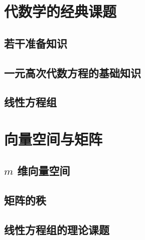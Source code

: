 \documentclass[a4paper, 11pt]{ctexbook}
\begin{document}
    \chapter{代数学的经典课题}
        \section{若干准备知识}
        \section{一元高次代数方程的基础知识}
        \section{线性方程组}
    \chapter{向量空间与矩阵}
        \section{$m$ 维向量空间}
            
        \section{矩阵的秩}
            
        \section{线性方程组的理论课题}
            
\end{document}
